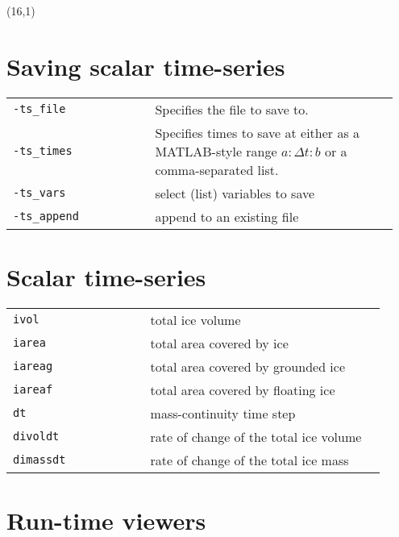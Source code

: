 \documentclass[landscape]{article}
\begin{document}
\begin{textblock}{15}(16,1)

\section{Saving scalar time-series}
\begin{tabular}{@{}p{0.35\linewidth}p{0.6\linewidth}@{}}
  \texttt{-ts_file} & Specifies the file to save to.\\
  \texttt{-ts_times} & Specifies times to save at either as a MATLAB-style range $a:\Delta t:b$ or a comma-separated list. \\
  \texttt{-ts_vars} & select (list) variables to save\\
 \texttt{-ts_append} & append to an existing file\\
\end{tabular}

\section{Scalar time-series}
\label{sec:scalar-time-series}

\begin{tabular}{@{}p{0.35\linewidth}p{0.6\linewidth}@{}}
\texttt{ivol} & total ice volume\\
\texttt{iarea} & total area covered by ice\\
\texttt{iareag} & total area covered by grounded ice\\
\texttt{iareaf} & total area covered by floating ice\\
\texttt{dt} & mass-continuity time step\\
\texttt{divoldt} & rate of change of the total ice volume\\
\texttt{dimassdt} & rate of change of the total ice mass\\
\end{tabular}

\section{Run-time viewers}
\label{sec:run-time-viewers}


\end{textblock}
\end{document}

